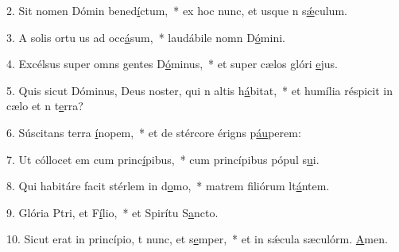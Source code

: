 2. Sit nomen Dómin bened\uline{í}ctum,~* ex hoc nunc, et usque n s\uline{ǽ}culum.\par 
3. A solis ortu us ad occ\uline{á}sum,~* laudábile nomn D\uline{ó}mini.\par 
4. Excélsus super omns gentes D\uline{ó}minus,~* et super cælos glóri \uline{e}jus.\par 
5. Quis sicut Dóminus, Deus noster, qui n altis h\uline{á}bitat,~* et humília réspicit in cælo et n t\uline{e}rra?\par 
6. Súscitans  terra \uline{í}nopem,~* et de stércore érigns p\uline{áu}perem:\par 
7. Ut cóllocet em cum princ\uline{í}pibus,~* cum princípibus pópul s\uline{u}i.\par 
8. Qui habitáre facit stérlem in d\uline{o}mo,~* matrem filiórum lt\uline{á}ntem.\par 
9. Glória Ptri, et F\uline{í}lio,~* et Spirítu S\uline{a}ncto.\par 
10. Sicut erat in princípio, t nunc, et s\uline{e}mper,~* et in sǽcula sæculórm. \uline{A}men.\par 
